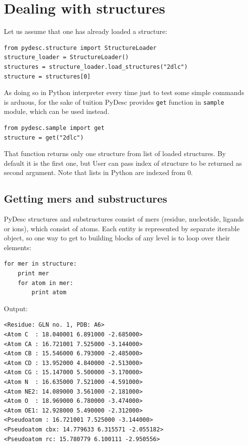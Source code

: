 \documentclass{article}
\begin{document}

\section{Dealing with structures} \label{STCsec}

Let us assume that one has already loaded a structure:

\begin{lstlisting}
from pydesc.structure import StructureLoader
structure_loader = StructureLoader()
structures = structure_loader.load_structures("2dlc")
structure = structures[0]
\end{lstlisting}

    As doing so in Python interpreter every time just to test some simple commands is arduous, for the sake of tuition PyDesc provides \texttt{get} function in \texttt{sample} module, which can be used instead.

\begin{lstlisting}
from pydesc.sample import get
structure = get("2dlc")
\end{lstlisting}
    
    That function returns only one structure from list of loaded structures. By default it is the first one, but User can pass index of structure to be returned as second argument. Note that lists in Python are indexed from 0.

%
%
%
\subsection{Getting mers and substructures}

    PyDesc structures and substructures consist of mers (residue, nucleotide, ligands or ions), which consist of atoms. Each entity is represented by separate iterable object, so one way to get to building blocks of any level is to loop over their elements:

\begin{lstlisting}
for mer in structure:
    print mer
    for atom in mer:
        print atom
\end{lstlisting}
Output:
\begin{lstlisting}
<Residue: GLN no. 1, PDB: A6>
<Atom C  : 18.040001 6.891000 -2.685000>
<Atom CA : 16.721001 7.525000 -3.144000>
<Atom CB : 15.546000 6.793000 -2.485000>
<Atom CD : 13.952000 4.840000 -2.513000>
<Atom CG : 15.147000 5.500000 -3.170000>
<Atom N  : 16.635000 7.521000 -4.591000>
<Atom NE2: 14.089000 3.561000 -2.181000>
<Atom O  : 18.969000 6.780000 -3.474000>
<Atom OE1: 12.928000 5.490000 -2.312000>
<Pseudoatom : 16.721001 7.525000 -3.144000>
<Pseudoatom cbx: 14.779633 6.315571 -2.055182>
<Pseudoatom rc: 15.780779 6.100111 -2.950556>
\end{lstlisting}
\end{document}
